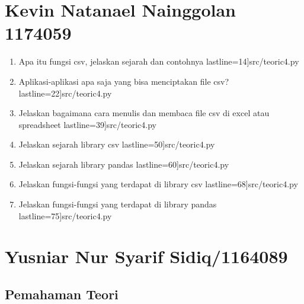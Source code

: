 \section {Kevin Natanael Nainggolan 1174059}
	\begin {enumerate}
		\item Apa itu fungsi csv, jelaskan sejarah dan contohnya 
			 lastline=14]{src/teoric4.py}
		\item Aplikasi-aplikasi apa saja yang bisa menciptakan file csv? 
			 lastline=22]{src/teoric4.py}
		\item Jelaskan bagaimana cara menulis dan membaca file csv di excel atau spreadsheet
			 lastline=39]{src/teoric4.py}
		\item Jelaskan sejarah library csv
			 lastline=50]{src/teoric4.py}
		\item Jelaskan sejarah library pandas
			 lastline=60]{src/teoric4.py}
		\item Jelaskan fungsi-fungsi yang terdapat di library csv
			 lastline=68]{src/teoric4.py}
		\item Jelaskan fungsi-fungsi yang terdapat di library pandas
			 lastline=75]{src/teoric4.py}
	\end {enumerate}




\section{Yusniar Nur Syarif Sidiq/1164089}
\subsection{Pemahaman Teori}

